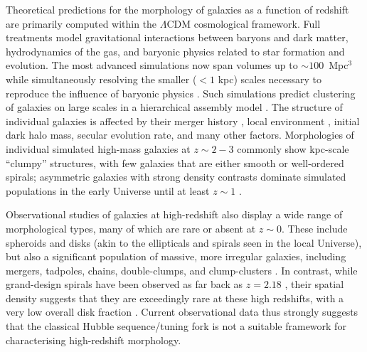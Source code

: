 \documentclass[a4paper,fleqn,usenatbib]{mnras}
\begin{document}
Theoretical predictions for the morphology of galaxies as a function of
redshift are primarily computed within the $\Lambda$CDM cosmological framework.
Full treatments model gravitational interactions between baryons and dark
matter, hydrodynamics of the gas, and baryonic physics related to star
formation and evolution. The most advanced simulations now span volumes up to
$\sim100$~Mpc$^3$ while simultaneously resolving the smaller ($<1$ kpc) scales
necessary to reproduce the influence of baryonic physics \citep{vog14a,sch15}.
Such simulations predict clustering of galaxies on large scales in a
hierarchical assembly model \citep{sil12}. The structure of individual galaxies
is affected by their merger history \citep{too72,ste02,hop10,kav14,kav14a}, local
environment \citep[\eg, the morphology-density relation;][]{dre80}, initial
dark halo mass, secular evolution rate, and many other factors. Morphologies of
individual simulated high-mass galaxies at $z\sim2-3$ commonly show kpc-scale
``clumpy'' structures, with few galaxies that are either smooth or well-ordered
spirals; asymmetric galaxies with strong density contrasts dominate simulated
populations in the early Universe until at least $z\sim1$ \citep{bel12,gen14}. 

Observational studies of galaxies at high-redshift also display a wide range of
morphological types, many of which are rare or absent at $z\sim0$.  These
include spheroids and disks (akin to the ellipticals and spirals seen in the
local Universe), but also a significant population of massive, more irregular
galaxies, including mergers, tadpoles, chains, double-clumps, and
clump-clusters \citep{elm05,elm07,cam11a,for11a,kar15}.  In contrast, while
grand-design spirals have been observed as far back as $z=2.18$ \citep{law12},
their spatial density suggests that they are exceedingly rare at these high
redshifts, with a very low overall disk fraction \citep{mor13}. Current
observational data thus strongly suggests that the classical Hubble
sequence/tuning fork \citep{hub36} is not a suitable framework for
characterising high-redshift morphology. 
\end{document}
